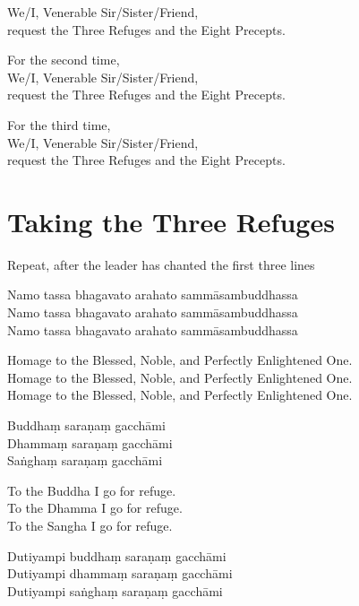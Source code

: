 \begin{english}
  We/I, Venerable Sir/Sister/Friend,\\
  request the Three Refuges and the Eight Precepts.

  For the second time,\\
  We/I, Venerable Sir/Sister/Friend,\\
  request the Three Refuges and the Eight Precepts.

  For the third time,\\
  We/I, Venerable Sir/Sister/Friend,\\
  request the Three Refuges and the Eight Precepts.
\end{english}

\clearpage
\chapter{Taking the Three Refuges}%

\begin{instruction}
  Repeat, after the leader has chanted the first three lines
\end{instruction}

Namo tassa bhagavato arahato sammāsambuddhassa\\
Namo tassa bhagavato arahato sammāsambuddhassa\\
Namo tassa bhagavato arahato sammāsambuddhassa

\begin{english}
  Homage to the Blessed, Noble, and Perfectly Enlightened One.\\
  Homage to the Blessed, Noble, and Perfectly Enlightened One.\\
  Homage to the Blessed, Noble, and Perfectly Enlightened One.
\end{english}

Buddhaṃ saraṇaṃ gacchāmi\\
Dhammaṃ saraṇaṃ gacchāmi\\
Saṅghaṃ saraṇaṃ gacchāmi

\begin{english}
  To the Buddha I go for refuge.\\
  To the Dhamma I go for refuge.\\
  To the Sangha I go for refuge.
\end{english}

Dutiyampi buddhaṃ saraṇaṃ gacchāmi\\
Dutiyampi dhammaṃ saraṇaṃ gacchāmi\\
Dutiyampi saṅghaṃ saraṇaṃ gacchāmi

